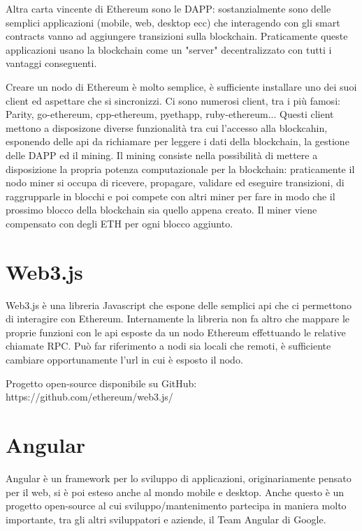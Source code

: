 \vspace{0.5cm}

Altra carta vincente di Ethereum sono le DAPP: sostanzialmente sono delle semplici applicazioni (mobile, web, desktop ecc) che interagendo con gli smart contracts vanno ad aggiungere transizioni sulla blockchain.
Praticamente queste applicazioni usano la blockchain come un "server" decentralizzato con tutti i vantaggi conseguenti.

\vspace{0.5cm}

Creare un nodo di Ethereum è molto semplice, è sufficiente installare uno dei suoi client ed aspettare che si sincronizzi. Ci sono numerosi client, tra i più famosi: Parity, go-ethereum, cpp-ethereum, pyethapp, ruby-ethereum...
Questi client mettono a disposizone diverse funzionalità tra cui l'accesso alla blockcahin, esponendo delle api da richiamare per leggere i dati della blockchain, la gestione delle DAPP ed il mining.
Il mining consiste nella possibilità di mettere a disposizione la propria potenza computazionale per la blockchain: praticamente il nodo miner si occupa di ricevere, propagare, validare ed eseguire transizioni, di raggrupparle in blocchi e poi compete con altri miner per fare in modo che il prossimo blocco della blockchain sia quello appena creato. Il miner viene compensato con degli ETH per ogni blocco aggiunto.

\section{Web3.js}
Web3.js è una libreria Javascript che espone delle semplici api che ci permettono di interagire con Ethereum.
Internamente la libreria non fa altro che mappare le proprie funzioni con le api esposte da un nodo Ethereum effettuando le relative chiamate RPC.
Può far riferimento a nodi sia locali che remoti, è sufficiente cambiare opportunamente l'url in cui è esposto il nodo.

Progetto open-source disponibile su GitHub:
https://github.com/ethereum/web3.js/


\section{Angular}

Angular è un framework per lo sviluppo di applicazioni, originariamente pensato per il web, si è poi esteso anche al mondo mobile e desktop.
Anche questo è un progetto open-source al cui sviluppo/mantenimento partecipa in maniera molto importante, tra gli altri sviluppatori e aziende, il Team Angular di Google.


